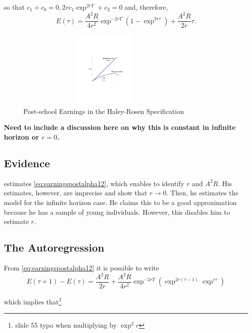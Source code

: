 \noindent so that $c_{1} + c_{0} = 0, 2rc_1 \exp^{2rT}  + c_{2} = 0$ and, therefore,
\begin{equation}
E(\tau) = \frac{A^2 R}{4r^2} \exp^{-2r T} \left( 1 - \exp^{2r \tau} \right) + \frac{A^2 R}{2r} \tau. \label{eq:earningspostalpha12}
\end{equation}

\begin{center}
\begin{figure}[H]
\caption{Post-school Earnings in the Haley-Rosen Specification}
\centering
\includegraphics[width=3.5in, height=1.5in]{Figures/fig-finite-horiz.pdf}
\end{figure}
\end{center}

\indent \textbf{Need to include a discussion here on why this is constant in infinite horizon or $r = 0$.}

\subsection{Evidence}
\citet{brown1976model} estimates \eqref{eq:earningspostalpha12}, which enables to identify $r$ and $A^2 R$. His estimates, however, are imprecise and show that $r \rightarrow 0$. Then, he estimates the model for the infinite horizon case. He claims this to be a good approximation because he has a sample of young individuals. However, this disables him to estimate $r$.

\subsection{The Autoregression}
From \eqref{eq:earningspostalpha12} it is possible to write
\begin{equation}
E(\tau + 1) - E(\tau) =  \frac{A^2 R}{2r}+ \frac{A^2 R}{4r^2} \exp^{-2rT} \left( \exp^{2r(\tau - 1)} \exp^{r \tau} \right) 
\end{equation}

\noindent which implies that\footnote{slide 55 typo when multiplying by $\exp^2r$}

